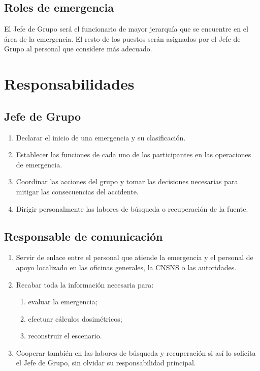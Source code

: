 \subsection{Roles de emergencia}

El Jefe de Grupo será el funcionario de mayor jerarquía que se encuentre en el área de la emergencia. El resto de los puestos serán asignados por el Jefe de Grupo al personal que considere más adecuado.

\section{Responsabilidades}

\subsection{Jefe de Grupo}
\begin{enumerate}
  \item Declarar el inicio de una emergencia y su clasificación.
  \item Establecer las funciones de cada uno de los participantes en las operaciones de emergencia.
  \item Coordinar las acciones del grupo y tomar las decisiones necesarias para mitigar las consecuencias del accidente.
  \item Dirigir personalmente las labores de búsqueda o recuperación de la fuente.
\end{enumerate}

\subsection{Responsable de comunicación}
\begin{enumerate}
  \item Servir de enlace entre el personal que atiende la emergencia y el personal de apoyo localizado en las oficinas generales, la CNSNS o las autoridades.
  \item Recabar toda la información necesaria para:
  \begin{enumerate}[label=\roman*.]
    \item evaluar la emergencia;
    \item efectuar cálculos dosimétricos;
    \item reconstruir el escenario.
  \end{enumerate}
  \item Cooperar también en las labores de búsqueda y recuperación si así lo solicita el Jefe de Grupo, sin olvidar su responsabilidad principal.
\end{enumerate}

